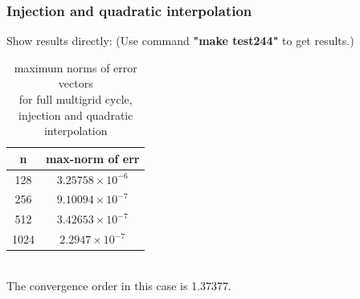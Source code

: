 \documentclass[a4paper,twocolumn]{article}
\theoremstyle{definition}
\begin{document}
\subsubsection{Injection and quadratic interpolation}
Show results directly: (Use command \textbf{"make test244"} to get results.)
\begin{table}[!htp]
	\centering
	\begin{tabular}{|c|c|}
		\hline	
		n  & max-norm of err \\
		\hline		
		128 & $3.25758\times 10^{-6}$ \\
		\hline		
		256 & $9.10094\times 10^{-7}$ \\
		\hline		
		512 & $3.42653\times 10^{-7}$ \\
		\hline		
		1024 & $2.2947\times 10^{-7}$ \\
		\hline
	\end{tabular}
	\caption{maximum norms of error vectors \\for full multigrid cycle, injection and quadratic interpolation}
\end{table}\\
The convergence order in this case is 1.37377.
\end{document}
